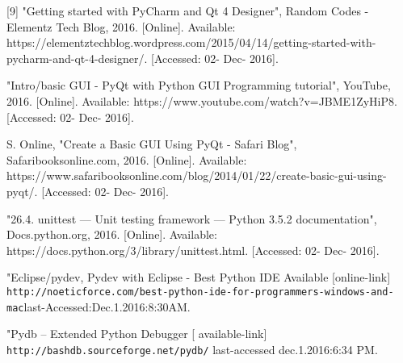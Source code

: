 \documentclass [10pt]{article}
\begin{document}
 [9] "Getting started with PyCharm and Qt 4 Designer", Random Codes - Elementz Tech Blog, 2016. [Online]. Available: https://elementztechblog.wordpress.com/2015/04/14/getting-started-with-pycharm-and-qt-4-designer/. [Accessed: 02- Dec- 2016]. \par
 [10] "Intro/basic GUI - PyQt with Python GUI Programming tutorial", YouTube, 2016. [Online]. Available: https://www.youtube.com/watch?v=JBME1ZyHiP8. [Accessed: 02- Dec- 2016]. \par
 [11] S. Online, "Create a Basic GUI Using PyQt - Safari Blog", Safaribooksonline.com, 2016. [Online]. Available: https://www.safaribooksonline.com/blog/2014/01/22/create-basic-gui-using-pyqt/. [Accessed: 02- Dec- 2016]. \par
 [12] "26.4. unittest — Unit testing framework — Python 3.5.2 documentation", Docs.python.org, 2016. [Online]. Available: https://docs.python.org/3/library/unittest.html. [Accessed: 02- Dec- 2016]. \par
 [13] "Eclipse/pydev, Pydev with Eclipse - Best Python IDE Available [online-link]  \texttt{http://noeticforce.com/best-python-ide-for-programmers-windows-and-mac}last-Accessed:Dec.1.2016:8:30AM.\par
 [14] "Pydb – Extended Python Debugger [ available-link] \texttt{http://bashdb.sourceforge.net/pydb/} last-accessed dec.1.2016:6:34 PM.\par 
\newpage
\end{document}
